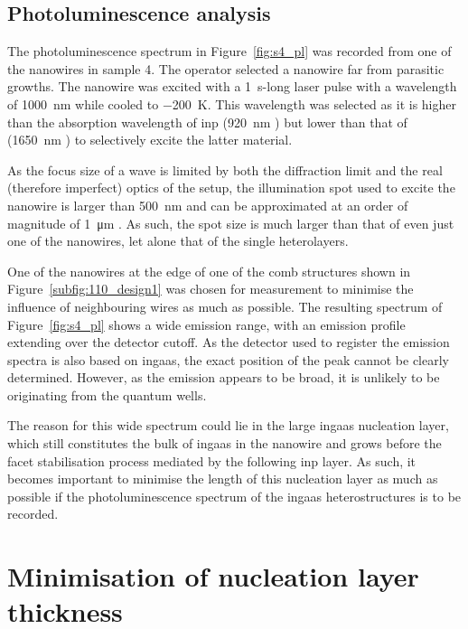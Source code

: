 \subsection{Photoluminescence analysis}

The photoluminescence spectrum in Figure~\ref{fig:s4_pl} was recorded from one of the nanowires in sample 4. The operator selected a nanowire far from parasitic growths. The nanowire was excited with a \qty{1}{\second}-long laser pulse with a wavelength of \qty{1000}{\nano\metre} while cooled to \qty{-200}{\kelvin}. This wavelength was selected as it is higher than the absorption wavelength of \acs{inp} (\qty{920}{\nano\metre} \cite{Bachmann1981}) but lower than that of  (\qty{1650}{\nano\metre} \cite{Takeda1976}) to selectively excite the latter material. 

As the focus size of a wave is limited by both the diffraction limit and the real (therefore imperfect) optics of the setup, the illumination spot used to excite the nanowire is larger than \qty{500}{\nano\metre} and can be approximated at an order of magnitude of \qty{1}{\micro\metre} \cite{Scherrer2021}. As such, the spot size is much larger than that of even just one of the nanowires, let alone that of the single heterolayers. 

One of the nanowires at the edge of one of the comb structures shown in Figure~\ref{subfig:110_design1} was chosen for measurement to minimise the influence of neighbouring wires as much as possible. The resulting spectrum of Figure~\ref{fig:s4_pl} shows a wide emission range, with an emission profile extending over the detector cutoff. As the detector used to register the emission spectra is also based on \acs{ingaas}, the exact position of the peak cannot be clearly determined. However, as the emission appears to be broad, it is unlikely to be originating from the quantum wells.

The reason for this wide spectrum could lie in the large \acs{ingaas} nucleation layer, which still constitutes the bulk of \acs{ingaas} in the nanowire and grows before the facet stabilisation process mediated by the following \acs{inp} layer. As such, it becomes important to minimise the length of this nucleation layer as much as possible if the photoluminescence spectrum of the \acs{ingaas} heterostructures is to be recorded.

\section{Minimisation of nucleation layer thickness}
\label{sec:s5}

